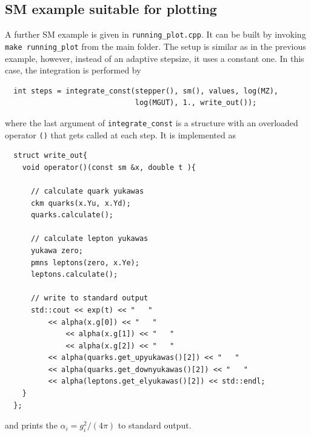\documentclass[11pt,a4paper]{article}
\begin{document}
\subsection{\label{sec::sm_plot_example} SM example suitable for plotting}
A further SM example is given in \texttt{running\_plot.cpp}. It can be built by invoking \texttt{make running\_plot} from the main folder.
The setup is similar as in the previous example, however, instead of an adaptive stepsize, it uses a constant one.
In this case, the integration is performed by
\begin{lstlisting}
  int steps = integrate_const(stepper(), sm(), values, log(MZ),
                              log(MGUT), 1., write_out());
\end{lstlisting}
where the last argument of \texttt{integrate\_const} is a structure with an overloaded operator \texttt{()} that gets called at each step.
It is implemented as
\begin{lstlisting}
  struct write_out{
    void operator()(const sm &x, double t ){

      // calculate quark yukawas
      ckm quarks(x.Yu, x.Yd);
      quarks.calculate();

      // calculate lepton yukawas
      yukawa zero;
      pmns leptons(zero, x.Ye);
      leptons.calculate();
    
      // write to standard output
      std::cout << exp(t) << "   "
	      << alpha(x.g[0]) << "   "
      	      << alpha(x.g[1]) << "   "
      	      << alpha(x.g[2]) << "   "
	      << alpha(quarks.get_upyukawas()[2]) << "   "
	      << alpha(quarks.get_downyukawas()[2]) << "   "
	      << alpha(leptons.get_elyukawas()[2]) << std::endl;
    }
  };
\end{lstlisting}
and prints the $\alpha_i = g_i^2/\left(4\pi\right)$ to standard output.
\end{document}
